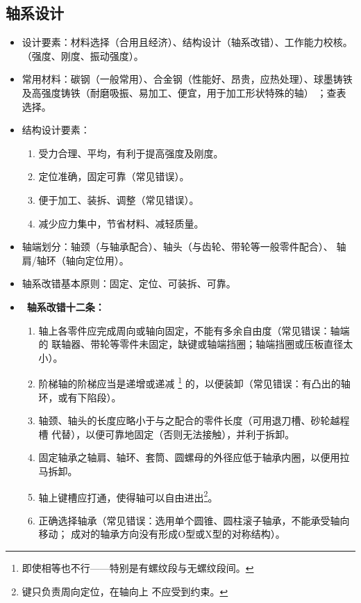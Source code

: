 \documentclass[12pt,a4paper]{article}
\newcommand{\tightlist}{\setlength{\parskip}{0pt}\setlength{\itemsep}{0pt}}
\newcommand{\hint}[1]{\textsf{（#1）}}
\newcommand{\minor}[1]{{\color{gray} #1}}
\renewcommand{\emph}[1]{\faIcon[regular]{lightbulb}\ \textbf{#1}}
\begin{document}
\subsection{轴系设计}
\begin{itemize}\tightlist
    \item 设计要素：材料选择\hint{合用且经济}、结构设计\hint{轴系改错}、工作能力校核。
    \hint{强度、刚度、振动强度}。
    \item 常用材料：碳钢\hint{一般常用}、合金钢\hint{性能好、昂贵，应热处理}、球墨铸铁
    及高强度铸铁\hint{耐磨吸振、易加工、便宜，用于加工形状特殊的轴}\minor{；查表选择}。
    \item 结构设计要素：
    \begin{enumerate}\tightlist
        \item 受力合理、平均，有利于提高强度及刚度。
        \item 定位准确，固定可靠\hint{常见错误}。
        \item 便于加工、装拆、调整\hint{常见错误}。
        \item 减少应力集中，节省材料、减轻质量。
    \end{enumerate}
    \item 轴端划分：轴颈\hint{与轴承配合}、轴头\hint{与齿轮、带轮等一般零件配合}、
    轴肩/轴环\hint{轴向定位用}。
    \item 轴系改错基本原则：固定、定位、可装拆、可靠。
    \item \emph{轴系改错十二条：}
    \begin{enumerate}\tightlist
        \item 轴上各零件应完成周向或轴向固定，不能有多余自由度\hint{常见错误：轴端的
        联轴器、带轮等零件未固定，缺键或轴端挡圈；轴端挡圈或压板直径太小}。
        \item 阶梯轴的阶梯应当是递增或递减
        \footnote{即使相等也不行——特别是有螺纹段与无螺纹段间。}
        的，以便装卸\hint{常见错误：有凸出的轴环，或有下陷段}。
        \item 轴颈、轴头的长度应略小于与之配合的零件长度\hint{可用退刀槽、砂轮越程槽
        代替}，以便可靠地固定\hint{否则无法接触}，并利于拆卸。
        \item 固定轴承之轴肩、轴环、套筒、圆螺母的外径应低于轴承内圈，以便用拉马拆卸。
        \item 轴上键槽应打通，使得轴可以自由进出\footnote{键只负责周向定位，在轴向上
        不应受到约束。}。
        \item 正确选择轴承\hint{常见错误：选用单个圆锥、圆柱滚子轴承，不能承受轴向移动；
        成对的轴承方向没有形成O型或X型的对称结构}。

\end{enumerate}
\end{itemize}
\end{document}
